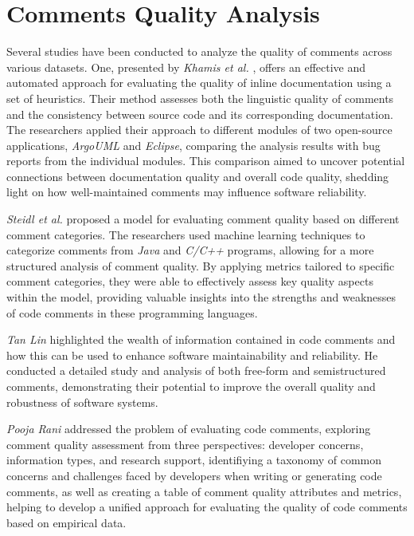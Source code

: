 \section{Comments Quality Analysis}
Several studies have been conducted to analyze the quality of comments across various datasets. One, presented by \textit{Khamis et al.} \cite{javadocMiner}, offers an effective and automated approach for evaluating the quality of inline documentation using a set of heuristics. Their method assesses both the linguistic quality of comments and the consistency between source code and its corresponding documentation. The researchers applied their approach to different modules of two open-source applications, \textit{ArgoUML} and \textit{Eclipse}, comparing the analysis results with bug reports from the individual modules. This comparison aimed to uncover potential connections between documentation quality and overall code quality, shedding light on how well-maintained comments may influence software reliability.

\noindent \textit{Steidl et al.} \cite{steidl2013} proposed a model for evaluating comment quality based on different comment categories. The researchers used machine learning techniques to categorize comments from \textit{Java} and \textit{C/C++} programs, allowing for a more structured analysis of comment quality. By applying metrics tailored to specific comment categories, they were able to effectively assess key quality aspects within the model, providing valuable insights into the strengths and weaknesses of code comments in these programming languages.

\noindent \textit{Tan Lin} \cite{TAN2015493} highlighted the wealth of information contained in code comments and how this can be used to enhance software maintainability and reliability. He conducted a detailed study and analysis of both free-form and semistructured comments, demonstrating their potential to improve the overall quality and robustness of software systems.

\noindent \textit{Pooja Rani} \cite{Rani2021} addressed the problem of evaluating code comments, exploring comment quality assessment from three perspectives: developer concerns, information types, and research support, identifiying a taxonomy of common concerns and challenges faced by developers when writing or generating code comments, as well as creating a table of comment quality attributes and metrics, helping to develop a unified approach for evaluating the quality of code comments based on empirical data.

